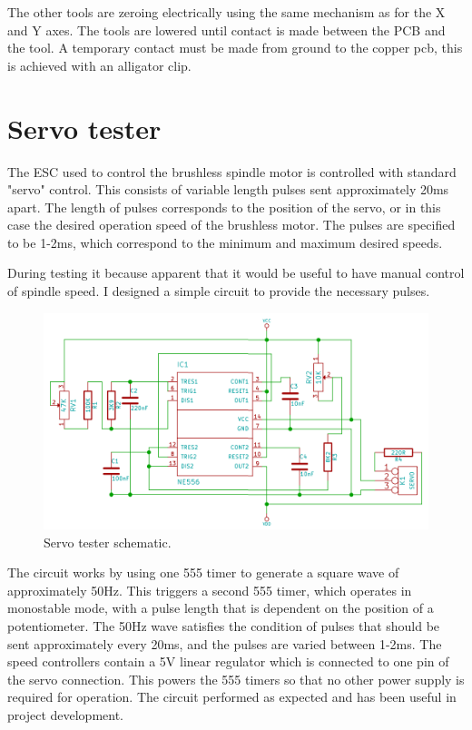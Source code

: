 \documentclass[a4paper,11pt]{article}  %
\begin{document}
The other tools are zeroing electrically using the same mechanism as for the X and Y axes. The tools are lowered until contact is made between the PCB and the tool. A temporary contact must be made from ground
to the copper pcb, this is achieved with an alligator clip.

\newpage
\appendix
\appendixpage
\addappheadtotoc
\section{Servo tester}

The ESC used to control the brushless spindle motor is controlled with standard "servo" control. This consists of variable length pulses sent approximately 20ms apart.
The length of pulses corresponds to the position of the servo, or in this case the desired operation speed of the brushless motor. The pulses are specified to be 1-2ms,
which correspond to the minimum and maximum desired speeds.

During testing it because apparent that it would be useful to have manual control of spindle speed. I designed a simple circuit to provide the necessary pulses.

\begin{figure}[ht!]
\centering
\includegraphics[width=150mm]{resources/servoexerciser.png}
\caption{Servo tester schematic.}
\label{overflow}
\end{figure}

The circuit works by using one 555 timer to generate a square wave of approximately 50Hz. This triggers a second 555 timer, which operates in monostable mode, with a pulse length
that is dependent on the position of a potentiometer. The 50Hz wave satisfies the condition of pulses that should be sent approximately every 20ms, and the pulses are varied between 1-2ms. The speed controllers
contain a 5V linear regulator which is connected to one pin of the servo connection. This powers the 555 timers so that no other power supply is required for operation. The circuit performed as expected and 
has been useful in project development.
\end{document}
